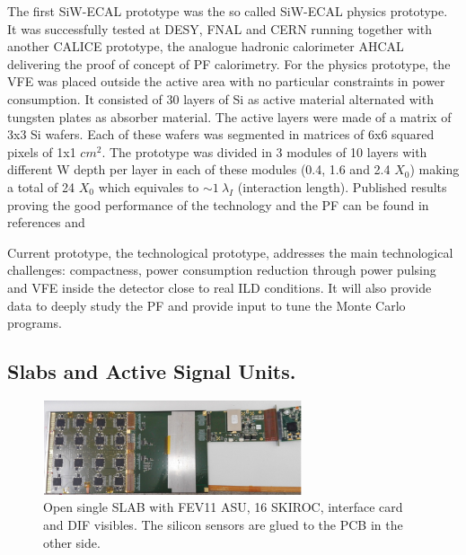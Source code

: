 \documentclass[journal]{IEEEtran}
\begin{document}
The first SiW-ECAL prototype was the so called SiW-ECAL physics prototype.
It was successfully tested at DESY, FNAL and CERN running together with another CALICE prototype,
the analogue hadronic calorimeter AHCAL delivering the proof of concept of PF calorimetry.
For the physics prototype, the VFE was placed outside the active area with no particular constraints in power consumption.
It consisted of 30 layers of Si as active material alternated with tungsten plates as absorber material.
The active layers were made of a matrix of 3x3 Si wafers. Each of these wafers was segmented in matrices of
6x6 squared pixels of 1x1 $cm^{2}$.
The prototype was divided in 3 modules of 10 layers with different W depth per layer in each of these modules
(0.4, 1.6 and 2.4 $X_{0}$) making a total of 24 $X_{0}$ which equivales to $\sim 1~\lambda_{I}$ (interaction length).
Published results proving the good performance of the technology and the PF can be found in references \cite{Adloff:2011ha,Anduze:2008hq,Adloff:2008aa,Adloff:2010xj,CALICE:2011aa} and \cite{Bilki:2014uep} 

Current prototype, the technological prototype, addresses the main technological challenges: compactness,
power consumption reduction through power pulsing and VFE inside the detector close to real ILD conditions.
It will also provide data to deeply study the PF and provide input to tune the Monte Carlo programs.

\subsection{Slabs and Active Signal Units.}

\begin{figure}[!t]
\centering
\includegraphics[width=3.0in]{shortslab.eps}
\caption{Open single SLAB with FEV11 ASU, 16 SKIROC, interface card and DIF visibles. The silicon sensors are glued to the PCB in the other side.}
\label{shortslab}
\end{figure}
\end{document}
